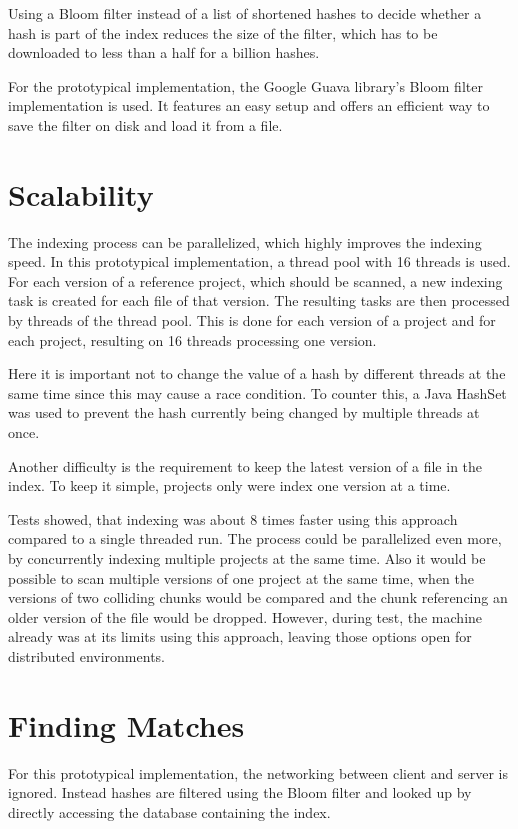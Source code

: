 Using a Bloom filter instead of a list of shortened hashes to decide whether a hash is part of the index reduces the size of the filter, which has to be downloaded to less than a half for a billion hashes.

For the prototypical implementation, the Google Guava library's Bloom filter implementation is used.
It features an easy setup and offers an efficient way to save the filter on disk and load it from a file.

\section{Scalability}\label{section:implementation/scalability}
The indexing process can be parallelized, which highly improves the indexing speed.
In this prototypical implementation, a thread pool with 16 threads is used.
For each version of a reference project, which should be scanned, a new indexing task is created for each file of that version.
The resulting tasks are then processed by threads of the thread pool.
This is done for each version of a project and for each project, resulting on 16 threads processing one version.

Here it is important not to change the value of a hash by different threads at the same time since this may cause a race condition.
To counter this, a Java HashSet was used to prevent the hash currently being changed by multiple threads at once.

Another difficulty is the requirement to keep the latest version of a file in the index.
To keep it simple, projects only were index one version at a time.

Tests showed, that indexing was about 8 times faster using this approach compared to a single threaded run.
The process could be parallelized even more, by concurrently indexing multiple projects at the same time.
Also it would be possible to scan multiple versions of one project at the same time, when the versions of two colliding chunks would be compared and the chunk referencing an older version of the file would be dropped.
However, during test, the machine already was at its limits using this approach, leaving those options open for distributed environments.

\section{Finding Matches}\label{section:implementation/finding_matches}
For this prototypical implementation, the networking between client and server is ignored.
Instead hashes are filtered using the Bloom filter and looked up by directly accessing the database containing the index.

